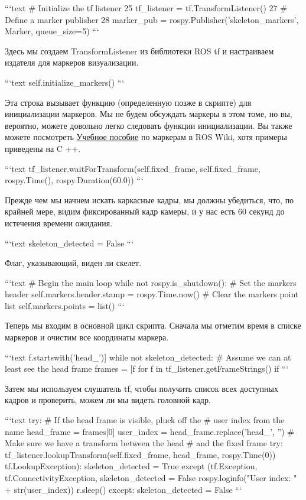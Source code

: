 ```text
# Initialize the tf listener
25 tf_listener = tf.TransformListener()
27 # Define a marker publisher
28 marker_pub = rospy.Publisher('skeleton_markers', Marker, queue_size=5)
```

Здесь мы создаем TransformListener из библиотеки ROS tf и настраиваем издателя для маркеров визуализации.

```text
self.initialize_markers()
```

Эта строка вызывает функцию (определенную позже в скрипте) для инициализации маркеров. Мы не будем обсуждать маркеры в этом томе, но вы, вероятно, можете довольно легко следовать функции инициализации. Вы также можете посмотреть \href{http://ros.org/wiki/rviz/Tutorials/Markers:%20Basic%20Shapes}{Учебное пособие} по маркерам в ROS Wiki, хотя примеры приведены на C ++.

```text
tf_listener.waitForTransform(self.fixed_frame, self.fixed_frame, rospy.Time(), rospy.Duration(60.0))
```

Прежде чем мы начнем искать каркасные кадры, мы должны убедиться, что, по крайней мере, видим фиксированный кадр камеры, и у нас есть 60 секунд до истечения времени ожидания.

```text
skeleton_detected = False
```

Флаг, указывающий, виден ли скелет.

```text
# Begin the main loop
while not rospy.is_shutdown():
# Set the markers header self.markers.header.stamp = rospy.Time.now()
    # Clear the markers point list
self.markers.points = list()
```

Теперь мы входим в основной цикл скрипта. Сначала мы отметим время в списке маркеров и очистим все координаты маркера.

```text
f.startswith('head_')]
while not skeleton_detected:
# Assume we can at least see the head frame
frames = [f for f in tf_listener.getFrameStrings() if
```

Затем мы используем слушатель tf, чтобы получить список всех доступных кадров и проверить, можем ли мы видеть головной кадр.

```text
try:
# If the head frame is visible, pluck off the # user index from the name
head_frame = frames[0]
user_index = head_frame.replace('head_', '') 
# Make sure we have a transform between the head
# and the fixed frame
try:
tf_listener.lookupTransform(self.fixed_frame, head_frame, rospy.Time(0))
tf.LookupException): 
skeleton_detected = True
except (tf.Exception, tf.ConnectivityException,
skeleton_detected = False
rospy.loginfo("User index: " + str(user_index)) r.sleep()
except:
skeleton_detected = False
```

